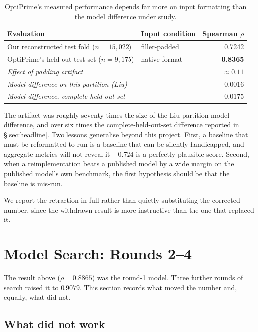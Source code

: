 \documentclass[11pt]{article}
\begin{document}
\begin{table}[H]
\centering
\caption{OptiPrime's measured performance depends far more on input formatting than
the model difference under study.}
\begin{tabular}{llr}
\toprule
Evaluation & Input condition & Spearman $\rho$ \\
\midrule
Our reconstructed test fold ($n=15{,}022$) & filler-padded & 0.7242 \\
OptiPrime's held-out test set ($n=9{,}175$) & native format & \textbf{0.8365} \\
\midrule
\multicolumn{2}{l}{\emph{Effect of padding artifact}} & $\approx 0.11$ \\
\multicolumn{2}{l}{\emph{Model difference on this partition (Liu)}} & $0.0016$ \\
\multicolumn{2}{l}{\emph{Model difference, complete held-out set}} & $0.0175$ \\
\bottomrule
\end{tabular}
\end{table}

The artifact was roughly seventy times the size of the Liu-partition model difference, and over six times the complete-held-out-set difference reported in \S\ref{sec:headline}. Two
lessons generalise beyond this project. First, a baseline that must be reformatted
to run is a baseline that can be silently handicapped, and aggregate metrics will
not reveal it -- $0.724$ is a perfectly plausible score. Second, when a
reimplementation beats a published model by a wide margin on the published model's
own benchmark, the first hypothesis should be that the baseline is mis-run.

We report the retraction in full rather than quietly substituting the corrected
number, since the withdrawn result is more instructive than the one that replaced it.



\section{Model Search: Rounds 2--4}
\label{sec:rounds}

The result above ($\rho=0.8865$) was the round-1 model. Three further rounds of
search raised it to $0.9079$. This section records what moved the number and,
equally, what did not.

\subsection{What did not work}
\end{document}
